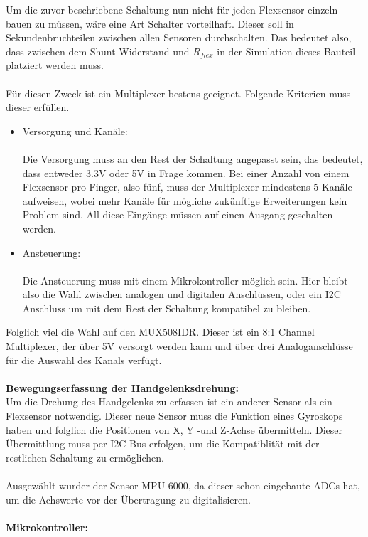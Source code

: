 \documentclass[11pt]{article}
\begin{document}
Um die zuvor beschriebene Schaltung nun nicht für jeden Flexsensor einzeln bauen zu müssen, wäre eine Art Schalter vorteilhaft.
Dieser soll in Sekundenbruchteilen zwischen allen Sensoren durchschalten. Das bedeutet also, dass zwischen dem Shunt-Widerstand
und $R_{flex}$ in der Simulation dieses Bauteil platziert werden muss. \\
\\
Für diesen Zweck ist ein Multiplexer bestens geeignet. Folgende Kriterien muss dieser erfüllen.
\begin{itemize}
	\item Versorgung und Kanäle: \\
		  \\ 
		  Die Versorgung muss an den Rest der Schaltung angepasst sein, das bedeutet, dass entweder 3.3V oder 5V in Frage kommen.
		  Bei einer Anzahl von einem Flexsensor pro Finger, also fünf, muss der Multiplexer mindestens 5 Kanäle aufweisen, wobei 
		  mehr Kanäle für mögliche zukünftige Erweiterungen kein Problem sind. All diese Eingänge müssen auf einen Ausgang geschalten
		  werden.
	\item Ansteuerung: \\
		  \\ 
		  Die Ansteuerung muss mit einem Mikrokontroller möglich sein. Hier bleibt also die Wahl zwischen analogen und digitalen 
		  Anschlüssen, oder ein I2C Anschluss um mit dem Rest der Schaltung kompatibel zu bleiben.
\end{itemize}
Folglich viel die Wahl auf den MUX508IDR. Dieser ist ein 8:1 Channel Multiplexer, der über 5V versorgt werden kann und über drei 
Analoganschlüsse für die Auswahl des Kanals verfügt. \\
\\
\textbf{Bewegungserfassung der Handgelenksdrehung:}
\\
Um die Drehung des Handgelenks zu erfassen ist ein anderer Sensor als ein Flexsensor notwendig. Dieser neue Sensor muss die 
Funktion eines Gyroskops haben und folglich die Positionen von X, Y -und Z-Achse übermitteln. Dieser Übermittlung muss per
I2C-Bus erfolgen, um die Kompatiblität mit der restlichen Schaltung zu ermöglichen. \\
\\
Ausgewählt wurder der Sensor MPU-6000, da dieser schon eingebaute ADCs hat, um die Achswerte vor der Übertragung zu digitalisieren. \\
\\
\textbf{Mikrokontroller:}
\\
\end{document}
